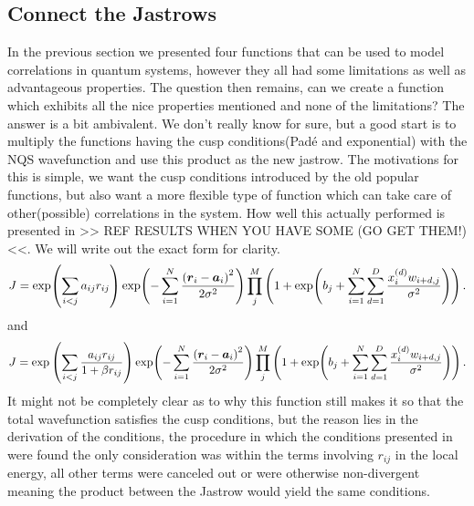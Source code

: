     \subsection{Connect the Jastrows}
        In the previous section we presented four functions that can be used to
        model correlations in quantum systems, however they all had some
        limitations as well as advantageous properties. The question then
        remains, can we create a function which exhibits all the nice
        properties mentioned and none of the limitations? The answer is a bit
        ambivalent. We don't really know for sure, but a good start is to
        multiply the functions having the cusp conditions(Pad\'e and
        exponential) with the NQS wavefunction and use this product as the new
        jastrow. The motivations for this is simple, we want the cusp
        conditions introduced by the old popular functions, but also want a
        more flexible type of function which can take care of other(possible)
        correlations in the system. How well this actually performed is
        presented in >> REF RESULTS WHEN YOU HAVE SOME (GO GET THEM!) <<. We
        will write out the exact form for clarity.
            \begin{equation}
                J = \exp(\sum\limits_{i<j}a_{ij} r_{ij})
                \exp(-\suml{i=1}{N} \frac{\left(\blds{r}_i -
                \blds{a}_i\right)^2}{2\sigma^2})\prod\limits^{M}_j \left(1 +
                \exp(b_j + \suml{i=1}{N}\suml{d=1}{D}
                \frac{x^{(d)}_iw_{i+d,j}}{\sigma^2})\right).
            \end{equation}
        and
            \begin{equation}
                J = \exp\left(\sum\limits_{i<j}\frac{a_{ij} r_{ij}}{1 + \beta
                r_{ij}}\right) \exp(-\suml{i=1}{N} \frac{\left(\blds{r}_i -
                \blds{a}_i\right)^2}{2\sigma^2})\prod\limits^{M}_j \left(1 +
                \exp(b_j + \suml{i=1}{N}\suml{d=1}{D}
                \frac{x^{(d)}_iw_{i+d,j}}{\sigma^2})\right).
            \end{equation}
        It might not be completely clear as to why this function still makes it
        so that the total wavefunction satisfies the cusp conditions, but the
        reason lies in the derivation of the conditions, the procedure in which
        the conditions presented in  were found the
        only consideration was within the terms involving $r_{ij}$ in the local
        energy, all other terms were canceled out or were otherwise
        non-divergent meaning the product between the Jastrow would yield the
        same conditions.

